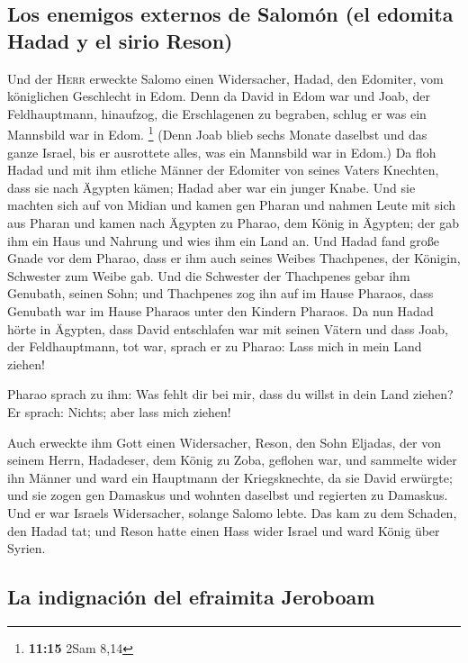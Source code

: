 \hypertarget{los-enemigos-externos-de-salomuxf3n-el-edomita-hadad-y-el-sirio-reson}{%
\subsection{Los enemigos externos de Salomón (el edomita Hadad y el
sirio
Reson)}\label{los-enemigos-externos-de-salomuxf3n-el-edomita-hadad-y-el-sirio-reson}}

 Und der \textsc{Herr} erweckte Salomo einen Widersacher,
Hadad, den Edomiter, vom königlichen Geschlecht in Edom. 
Denn da David in Edom war und Joab, der Feldhauptmann, hinaufzog, die
Erschlagenen zu begraben, schlug er was ein Mannsbild war in Edom.
\footnote{\textbf{11:15} 2Sam 8,14}  (Denn Joab blieb
sechs Monate daselbst und das ganze Israel, bis er ausrottete alles, was
ein Mannsbild war in Edom.)  Da floh Hadad und mit ihm
etliche Männer der Edomiter von seines Vaters Knechten, dass sie nach
Ägypten kämen; Hadad aber war ein junger Knabe.  Und sie
machten sich auf von Midian und kamen gen Pharan und nahmen Leute mit
sich aus Pharan und kamen nach Ägypten zu Pharao, dem König in Ägypten;
der gab ihm ein Haus und Nahrung und wies ihm ein Land an.
 Und Hadad fand große Gnade vor dem Pharao, dass er ihm
auch seines Weibes Thachpenes, der Königin, Schwester zum Weibe gab.
 Und die Schwester der Thachpenes gebar ihm Genubath,
seinen Sohn; und Thachpenes zog ihn auf im Hause Pharaos, dass Genubath
war im Hause Pharaos unter den Kindern Pharaos.  Da nun
Hadad hörte in Ägypten, dass David entschlafen war mit seinen Vätern und
dass Joab, der Feldhauptmann, tot war, sprach er zu Pharao: Lass mich in
mein Land ziehen!

 Pharao sprach zu ihm: Was fehlt dir bei mir, dass du
willst in dein Land ziehen? Er sprach: Nichts; aber lass mich ziehen!

 Auch erweckte ihm Gott einen Widersacher, Reson, den
Sohn Eljadas, der von seinem Herrn, Hadadeser, dem König zu Zoba,
geflohen war,  und sammelte wider ihn Männer und ward ein
Hauptmann der Kriegsknechte, da sie David erwürgte; und sie zogen gen
Damaskus und wohnten daselbst und regierten zu Damaskus. 
Und er war Israels Widersacher, solange Salomo lebte. Das kam zu dem
Schaden, den Hadad tat; und Reson hatte einen Hass wider Israel und ward
König über Syrien.

\hypertarget{la-indignaciuxf3n-del-efraimita-jeroboam}{%
\subsection{La indignación del efraimita
Jeroboam}\label{la-indignaciuxf3n-del-efraimita-jeroboam}}


